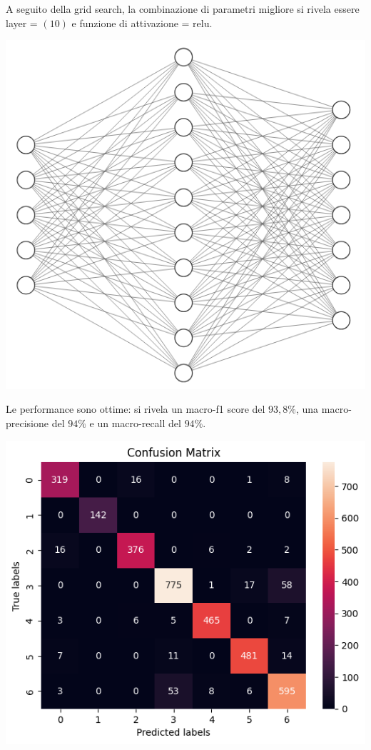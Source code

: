A seguito della grid search, la combinazione di parametri migliore si rivela essere 
layer = $(10)$ e funzione di attivazione = relu.

\begin{Figure}
    \centering
    \includegraphics[width=0.75\linewidth]{img/mlp.png}
\end{Figure}

Le performance sono ottime: si rivela un macro-f1 score del $93,8\%$, 
una macro-precisione del $94\%$ e un macro-recall del $94\%$.

\begin{Figure}
    \centering
    \includegraphics[width=\linewidth]{img/mlp_low_confusion_matrix.png}
\end{Figure}

